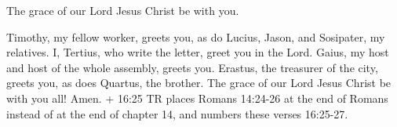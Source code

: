 The grace of our Lord Jesus Christ be with you.

 Timothy, my fellow worker, greets you, as do Lucius,
Jason, and Sosipater, my relatives.  I, Tertius, who write
the letter, greet you in the Lord.  Gaius, my host and host
of the whole assembly, greets you. Erastus, the treasurer of the city,
greets you, as does Quartus, the brother.  The grace of our
Lord Jesus Christ be with you all! Amen.  + 16:25 TR places
Romans 14:24-26 at the end of Romans instead of at the end of chapter
14, and numbers these verses 16:25-27.
